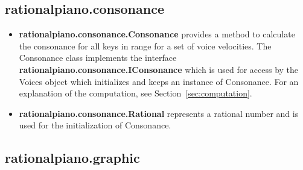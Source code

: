 \documentclass[12pt,a4paper,titlepage,oneside]{report}
\begin{document}
\subsection{rationalpiano.consonance}

\begin{itemize}
	\item \textbf{rationalpiano.consonance.Consonance} provides a method to calculate the consonance for all keys in range for a set of voice velocities. The Consonance class implements the interface \textbf{rationalpiano.consonance.IConsonance} which is used for access by the Voices object which initializes and keeps an instance of Consonance. For an explanation of the computation, see Section~\ref{sec:computation}.

	\item \textbf{rationalpiano.consonance.Rational} represents a rational number and is used for the initialization of Consonance.
\end{itemize}


\subsection{rationalpiano.graphic}
\end{document}
